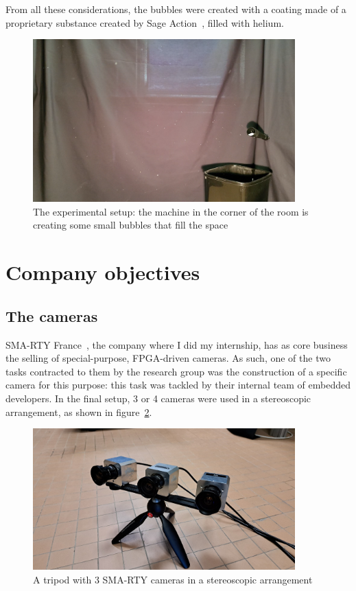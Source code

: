 From all these considerations, the bubbles were created with a coating made of a proprietary substance created by Sage Action~\cite{bubble-substance}, filled with helium.

\begin{figure}
	\centerline{\includegraphics[width=0.9\textwidth]{images/experimental-setup.png}}
	\caption{\centering The experimental setup: the machine in the corner of the room is creating some small bubbles that fill the space}
	\label{fig:experimetal-setup}
\end{figure}

\section{Company objectives}

\subsection{The cameras}

SMA-RTY France~\cite{smarty-website}, the company where I did my internship, has as core business the selling of special-purpose, FPGA-driven cameras.
As such, one of the two tasks contracted to them by the research group was the construction of a specific camera for this purpose: this task was tackled by their internal team of embedded developers.
In the final setup, 3 or 4 cameras were used in a stereoscopic arrangement, as shown in figure~\ref{fig:camera-setup}.

\begin{figure}
	\centerline{\includegraphics[width=0.9\textwidth]{images/cameras.jpg}}
	\caption{\centering A tripod with 3 SMA-RTY cameras in a stereoscopic arrangement}
	\label{fig:camera-setup}
\end{figure}

